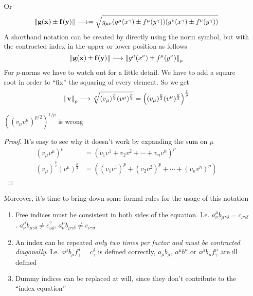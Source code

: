 \documentclass[../complete.tex]{subfiles}
\begin{document}
Or
\begin{equation*}
	\norm{\mathbf{g}(\mathbf{x})\pm\mathbf{f}(\mathbf{y})}\longrightarrow=\sqrt{g_{\mu\nu}(g^\mu(x^\gamma)\pm f^\mu(y^\gamma))(g^\nu(x^\gamma)\pm f^\nu(y^\gamma))}
\end{equation*}
A shorthand notation can be created by directly using the norm symbol, but with the contracted index in the upper or lower position as follows
\begin{equation}
	\norm{\mathbf{g}(\mathbf{x})\pm\mathbf{f}(\mathbf{y})}\longrightarrow\norm{g^\mu(x^\nu)\pm f^\mu(y^\nu)}_\mu
	\label{eq:normindex}
\end{equation}
For $p$-norms we have to watch out for a little detail. We have to add a square root in order to ``fix'' the squaring of every element. So we get
\begin{equation}
	\norm{\mathbf{v}}_{p}\overset{}{\longrightarrow}\sqrt[p]{(v_\mu)^{\frac{p}{2}} (v^\mu)^{\frac{p}{2}}}=\left( (v_\mu)^{\frac{p}{2}}(v^\mu)^{\frac{p}{2}} \right)^{\frac{1}{p}}
	\label{eq:pnormein}
\end{equation}
\begin{thm}
	$\left( (v_\mu v^\mu)^{p/2} \right)^{1/p}$ is wrong
\end{thm}
\begin{proof}
	It's easy to see why it doesn't work by expanding the sum on $\mu$
	\begin{equation}
		\begin{aligned}
			(v_\mu v^\mu)^p&=\left( v_1v^1+v_2v^2+\cdots+v_nv^n \right)^p\\
			(v_\mu)^{\frac{p}{2}}(v^\mu)^{\frac{p}{2}}&=\left( (v_1v^1)^{p}+(v_2v^2)^p+\cdots+(v_nv^n)^p \right)
		\end{aligned}
		\label{eq:pnormproof}
	\end{equation}
\end{proof}
Moreover, it's time to bring down some formal rules for the usage of this notation
\begin{thm}
	\begin{enumerate}
	\item Free indices must be consistent in both sides of the equation. I.e. $a^\mu_\nu b_{\mu\gamma\delta}=c_{\nu\gamma\delta}$. $a^\mu_\nu b_{\mu\gamma\delta}\ne c^\gamma_{\nu\delta}$, $a^\mu_\nu b_{\mu\gamma\delta}\ne c_{\nu\gamma\sigma}$
	\item An index can be repeated \emph{only two times per factor and must be contracted diagonally}. I.e. $a^\mu b_\mu f^\delta_\gamma=c^\delta_\gamma$ is defined correctly, $a_\mu b_\mu$, $a^\mu b^\mu$ or $a^\mu b_\mu f^\mu_\gamma$ are ill defined
	\item Dummy indices can be replaced at will, since they don't contribute to the ``index equation''
	\end{enumerate}
\end{thm}
\end{document}
